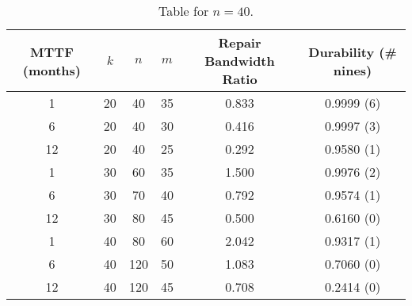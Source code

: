 \begin{table}[H]\centering


\begin{tabular}{| c | c c c | c | c|}\hline
MTTF (months) &$k$& $n$ & $m$ &Repair Bandwidth Ratio&Durability (\# nines) \\\hline 
1 &20& 40 & 35 & 0.833 & 0.9999 (6) \\ 
6 &20& 40 & 30 & 0.416 & 0.9997 (3)\\  
12 &20& 40 & 25 & 0.292 & 0.9580 (1)\\\hline
 
1 &30& 60 & 35 & 1.500 &0.9976 (2)\\  
6 &30& 70 & 40 & 0.792 &0.9574 (1)\\  
12 &30& 80 & 45 & 0.500 &0.6160 (0)\\\hline
 
1 &40& 80 & 60 & 2.042 &0.9317 (1)\\  
6 &40&120&50 & 1.083 &0.7060 (0)\\  
12 &40&120&45 & 0.708 &0.2414 (0)\\\hline

\end{tabular}
\caption{Table for $n=40$.}\label{table:n=40}
\end{table}